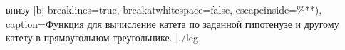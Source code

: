 \begin{itemize}
	 внизу [b] 
		breaklines=true,           %
		breakatwhitespace=false, %
		escapeinside={\%*}{*)},  %
		caption=Функция для вычисление катета по заданной гипотенузе и другому катету в прямоугольном треугольнике.
		]{./leg}
		
\end{itemize}